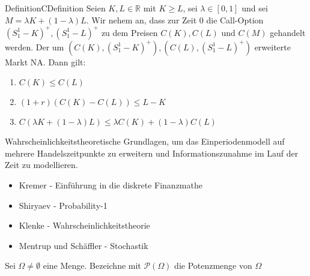 \documentclass[11.5 pt, a4paper]{memoir}
\begin{document}
\begin{ibox}[5.3]{Definition}{CDefinition}
    Seien $ K, L \in \mathbb{R} $ mit $ K \geq L $, sei $ \lambda \in \left[ 0,1 \right]  $ und sei $ M = \lambda K + \left( 1- \lambda \right)L  $. Wir nehem an, dass zur Zeit 0 die Call-Option $ \left( S_1^1 - K \right)^{+}, \left( S_1^1 -L \right)^{+} $ zu dem Preisen $ C (K), C (L) \text{ und }  C (M) $ gehandelt werden. Der um $ \left( C (K), \left( S_1^1 - K \right)^{+} \right) , \left( C (L), \left( S_1^1 - L \right)^{+} \right)  $ erweiterte Markt NA. Dann gilt: 
		\begin{enumerate}[label=\alph*)]
			\item $ C (K) \leq C (L) $ 
			\item $ \left( 1 + r \right) \left( C (K) - C (L) \right) \leq L - K $ 
			\item $ C \left( \lambda K + (1- \lambda) L \right) \leq \lambda C (K) + (1- \lambda) C (L)  $ 
		\end{enumerate}
\end{ibox}

Wahrscheinlichkeitstheoretische Grundlagen, um das Einperiodenmodell auf mehrere Handelszeitpunkte zu erweitern und Informationszunahme im Lauf der Zeit zu modellieren.

\begin{itemize}
	\item Kremer - Einführung in die diskrete Finanzmathe 
	\item Shiryaev - Probability-1
	\item Klenke - Wahrscheinlichkeitstheorie
	\item Mentrup und Schäffler - Stochastik
\end{itemize}

Sei $ \Omega \neq \emptyset $ eine Menge. Bezeichne mit $ \mathcal{P} (\Omega) $ die Potenzmenge von $ \Omega $ 
\end{document}
